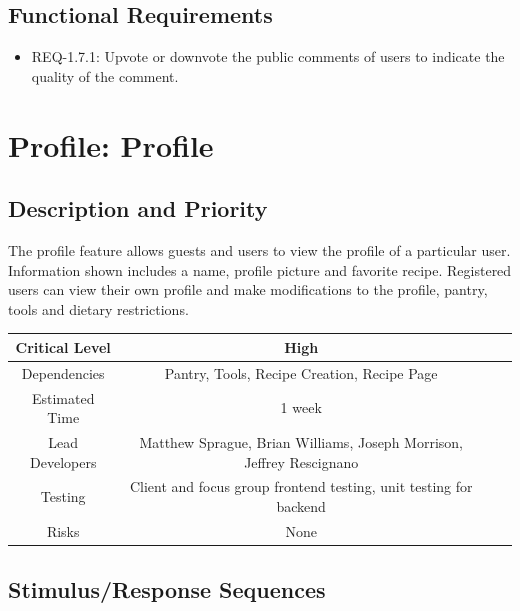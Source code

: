 \documentclass{scrreprt}
\begin{document}
\subsection{Functional Requirements}

\begin{itemize}
    \item REQ-1.7.1: Upvote or downvote the public comments of users to indicate the quality of the comment.
\end{itemize}

\section{Profile: Profile}

\subsection{Description and Priority}

The profile feature allows guests and users to view the profile of a particular user. Information shown includes a name, profile picture and favorite recipe. Registered users can view their own profile and make modifications to the profile, pantry, tools and dietary restrictions.

\begin{center}
    \begin{tabular}{| c | c | c | c |}
        \hline
        Critical Level  & High                                                                 \\
        \hline
        Dependencies    & Pantry, Tools, Recipe Creation, Recipe Page                          \\
        \hline
        Estimated Time  & 1 week                                                               \\
        \hline
        Lead Developers & Matthew Sprague, Brian Williams, Joseph Morrison, Jeffrey Rescignano \\
        \hline
        Testing         & Client and focus group frontend testing, unit testing for backend    \\
        \hline
        Risks           & None                                                                 \\
        \hline
    \end{tabular}
\end{center}

\subsection{Stimulus/Response Sequences}
\end{document}
